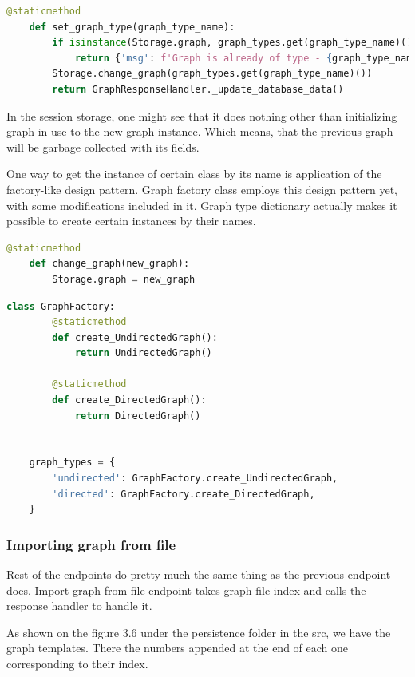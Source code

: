 \begin{lstlisting}[language={python}]
    @staticmethod
	def set_graph_type(graph_type_name):
		if isinstance(Storage.graph, graph_types.get(graph_type_name)().__class__):
			return {'msg': f'Graph is already of type - {graph_type_name}'}
		Storage.change_graph(graph_types.get(graph_type_name)())
		return GraphResponseHandler._update_database_data()
\end{lstlisting}

In the session storage, one might see that it does nothing other than initializing graph in use to the new graph instance. Which means, that the previous graph will be garbage collected with its fields.

One way to get the instance of certain class by its name is application of the factory-like design pattern. Graph factory class employs this design pattern yet, with some modifications included in it. Graph type dictionary actually makes it possible to create certain instances by their names.

\begin{lstlisting}[language={python}]
 	@staticmethod
	def change_graph(new_graph):
		Storage.graph = new_graph
\end{lstlisting}

\begin{lstlisting}[language={python}]
	class GraphFactory:
		@staticmethod
		def create_UndirectedGraph():
			return UndirectedGraph()
		
		@staticmethod
		def create_DirectedGraph():
			return DirectedGraph()
	
	
	graph_types = {
		'undirected': GraphFactory.create_UndirectedGraph,
		'directed': GraphFactory.create_DirectedGraph,
	}
\end{lstlisting}

\subsubsection{Importing graph from file}

Rest of the endpoints do pretty much the same thing as the previous endpoint does. Import graph from file endpoint takes graph file index and calls the response handler to handle it.

As shown on the figure 3.6 under the persistence folder in the src, we have the graph templates. There the numbers appended at the end of each one corresponding to their index.

